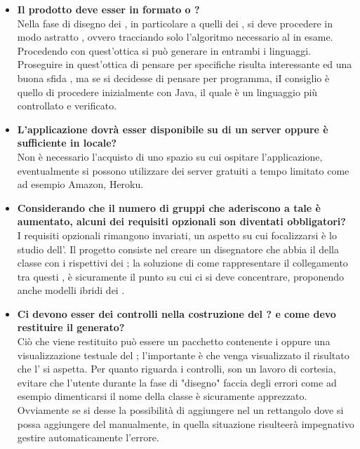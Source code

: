 \begin{itemize}
		   	 \item
	   	 \textbf{Il  prodotto deve esser in formato  o ?\\}
	   	 \justifying
	   	 Nella fase di disegno dei  , in particolare a quelli dei , si deve procedere in modo astratto , ovvero tracciando solo l'algoritmo necessario al  in esame. Procedendo con quest'ottica si può generare  in entrambi i linguaggi. Proseguire in quest'ottica di pensare per specifiche risulta interessante ed una buona sfida , ma se si decidesse di pensare per programma, iI consiglio è quello di procedere inizialmente con Java, il quale è un linguaggio più controllato e verificato.\\
		
		   	 \item
	   	 \textbf{L'applicazione dovrà esser disponibile su di un server oppure è sufficiente in locale?\\}
	   	\justifying
	   	 Non è necessario l'acquisto di uno spazio su cui ospitare l'applicazione, eventualmente si possono utilizzare dei server gratuiti a tempo limitato come ad esempio Amazon, Heroku.\\
		
		\item
	   	 \textbf{Considerando che il numero di gruppi che aderiscono a tale  è aumentato, alcuni dei requisiti opzionali son diventati obbligatori?\\}
	   	\justifying
	   	I requisiti opzionali rimangono invariati, un aspetto su cui focalizzarsi è lo studio dell'. Il progetto consiste nel creare un disegnatore che abbia il  della classe con i rispettivi  dei ; la soluzione di come rappresentare il collegamento tra questi , è sicuramente il punto su cui ci si deve concentrare, proponendo anche modelli ibridi dei .\\
	   	 
	   	 		\item
	   	 \textbf{Ci devono esser dei controlli nella costruzione del ? e come devo restituire il  generato? \\}
	   	\justifying
	   	 Ciò che viene restituito può essere un pacchetto contenente i  oppure una visualizzazione testuale del ; l'importante è che venga visualizzato il risultato che l' si aspetta. Per quanto riguarda i controlli, son un lavoro di cortesia, evitare che l'utente durante la fase di "disegno" faccia degli errori come ad esempio dimenticarsi il nome della classe è sicuramente apprezzato. Ovviamente se si desse la possibilità di aggiungere nel  un rettangolo dove si possa aggiungere del  manualmente, in quella situazione risulteerà impegnativo gestire automaticamente l'errore. 
	   	 \end{itemize}
